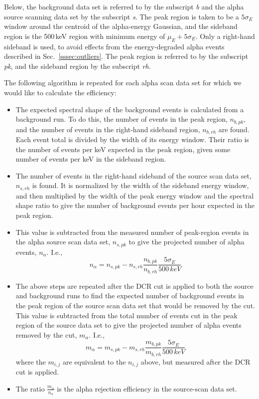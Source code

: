 \documentclass[groupedaddress,rmp,amsmath,amssymb,bibnotes,altaffilletter,twocolumn]{revtex4-1}
\begin{document}
Below, the background data set is referred to by the subscript {\it b} and the alpha source scanning data set by the subscript {\it s}. The peak region is taken to be a $5\sigma_E$ window around the centroid of the alpha-energy Gaussian, and the sideband region is the 500\,keV region with minimum energy of $\mu_E+5\sigma_E$. Only a right-hand sideband is used, to avoid effects from the energy-degraded alpha events described in Sec.~\ref{sssec:outliers}. The peak region is referred to by the subscript {\it pk}, and the sideband region by the subscript {\it rh}.

The following algorithm is repeated for each alpha scan data set for which we would like to calculate the efficiency:
\begin{itemize}
\item The expected spectral shape of the background events is calculated from a background run. To do this, the number of events in the peak region, $n_{b, pk}$, and the number of events in the right-hand sideband region, $n_{b, rh}$ are found. Each event total is divided by the width of its energy window. Their ratio is the number of events per keV expected in the peak region, given some number of events per keV in the sideband region.
\item The number of events in the right-hand sideband of the source scan data set, $n_{s, rh}$ is found. It is normalized by the width of the sideband energy window, and then multiplied by the width of the peak energy window and the spectral shape ratio to give the number of background events per hour expected in the peak region. 
\item This value is subtracted from the measured number of peak-region events in the alpha source scan data set, $n_{s, pk}$ to give the projected number of alpha events, $n_{\alpha}$. I.e., 
$$ n_{\alpha} =  n_{s, pk}-n_{s, rh}\frac{n_{b, pk}}{n_{b, rh}}\frac{5\sigma_E}{500\,keV} $$
\item The above steps are repeated after the DCR cut is applied to both the source and background runs to find the expected number of background events in the peak region of the source scan data set that would be removed by the cut. This value is subtracted from the total number of events cut in the peak region of the source data set to give the projected number of alpha events removed by the cut, $m_\alpha$. I.e.,
 $$ m_{\alpha} =  m_{s, pk}-m_{s, rh}\frac{m_{b, pk}}{m_{b, rh}}\frac{5\sigma_E}{500\,keV} $$
 where the $m_{i, j}$ are equivalent to the $n_{i, j}$ above, but measured after the DCR cut is applied. 
\item The ratio $\frac{m_\alpha}{n_\alpha}$ is the alpha rejection efficiency in the source-scan data set. 
\end{itemize}
\end{document}
